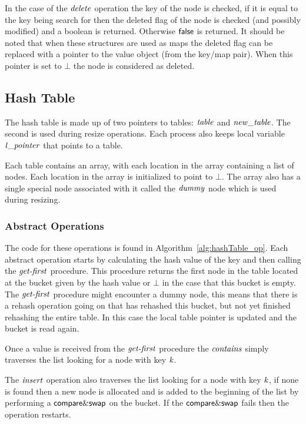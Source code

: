 In the case of the $\ms{delete}$ operation the key of the node is checked, if it is equal to the key being search for then
the deleted flag of the node is checked (and possibly modified) and a boolean is returned.
Otherwise $\lit{false}$ is returned.
It should be noted that when these structures are used as maps the deleted flag can be replaced with a pointer to the
value object (from the key/map pair).
When this pointer is set to $\bot$ the node is considered as deleted.



\subsection{Hash Table}

The hash table is made up of two pointers to tables:
$\ms{table}$ and $\ms{new\_table}$.
The second is used during resize operations.
Each process also keeps local variable $\ms{l\_pointer}$ that points to a table.

Each table contains an array, with each location in the array containing a list of nodes.
Each location in the array is initialized to point to $\bot$.
The array also has a single special node associated with it called the $\ms{dummy}$ node which is used
during resizing.



\subsubsection{Abstract Operations}
The code for these operations is found in Algorithm~\ref{alg:hashTable_op}.
Each abstract operation starts by calculating the hash value of the key and then calling
the $\ms{get-first}$ procedure.
This procedure returns the first node in the table located at the bucket given by the hash value
or $\bot$ in the case that this bucket is empty.
The $\ms{get-first}$ procedure might encounter a dummy node, this means that there is a rehash operation
going on that has rehashed this bucket, but not yet finished rehashing the entire table.
In this case the local table pointer is updated and the bucket is read again.

Once a value is received from the $\ms{get-first}$ procedure the $\ms{contains}$ simply traverses
the list looking for a node with key $\ms{k}$.

The $\ms{insert}$ operation also traverses
the list looking for a node with key $\ms{k}$, if none is found then a new node is allocated and is
added to the beginning of the list by performing a $\lit{compare\&swap}$ on the bucket.
If the $\lit{compare\&swap}$ fails then the operation restarts.

